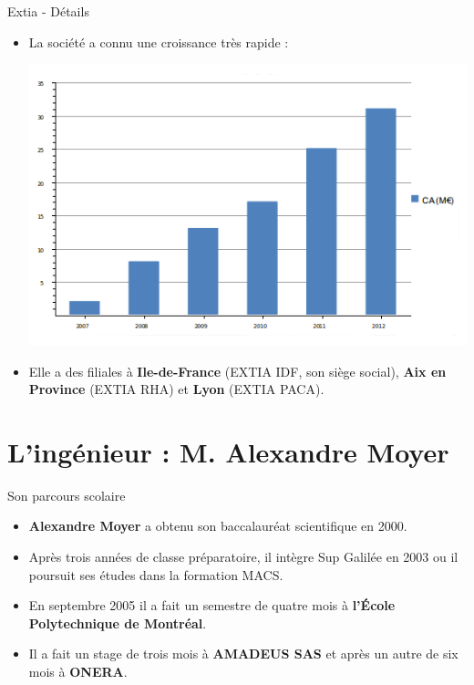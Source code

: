 \documentclass[xcolor=dvipsnames]{beamer}
\begin{document}
\begin{frame}{Extia - Détails}
\begin{itemize}[<+-| alert@+>]
	\item La société a connu une croissance très rapide :
	\begin{center}
	    \includegraphics[scale=0.45]{img/extia-profit.png}
	\end{center}
    \item Elle a des filiales à \textbf{Ile-de-France} (EXTIA IDF, son siège social),
\textbf{Aix en Province} (EXTIA RHA) et \textbf{Lyon} (EXTIA PACA).
\end{itemize}
\end{frame}

\section{L'ingénieur : M. Alexandre Moyer}
\begin{frame}{Son parcours scolaire}
\begin{itemize}[<+-| alert@+>]
    \item \textbf{Alexandre Moyer} a obtenu son baccalauréat scientifique en 2000.
	\item Après trois années de classe préparatoire, il intègre Sup Galilée en
2003 ou il poursuit ses études dans la formation MACS.
    \item En septembre 2005 il a fait un semestre de quatre mois à \textbf{l'École
Polytechnique de Montréal}.
	\item Il a fait un stage de trois mois \`a \textbf{AMADEUS SAS} et après un autre
de six mois à \textbf{ONERA}.
\end{itemize}
\end{frame}
\end{document}
